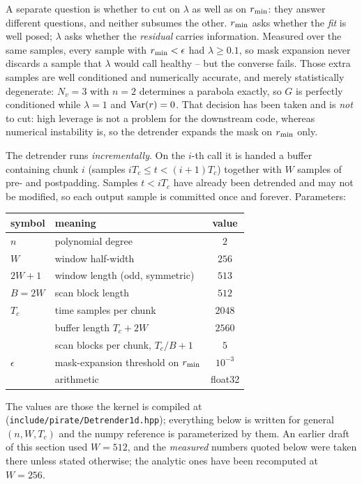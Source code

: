 \documentclass{article}
\numberwithin{equation}{section}   %
\begin{document}
A separate question is whether to cut on $\lambda$ as well as on $r_{\rm min}$: they answer different
questions, and neither subsumes the other.  $r_{\rm min}$ asks whether the {\em fit} is well posed; $\lambda$
asks whether the {\em residual} carries information.  Measured over the same samples, every sample with
$r_{\rm min} < \epsilon$ had $\lambda \ge 0.1$, so mask expansion never discards a sample that $\lambda$ would
call healthy -- but the converse fails.  Those extra samples are well conditioned and numerically accurate, and
merely statistically degenerate: $N_v = 3$ with $n = 2$ determines a parabola exactly, so $G$ is perfectly
conditioned while $\lambda = 1$ and ${\rm Var}(r) = 0$.  That decision has been taken and is {\em not} to cut:
high leverage is not a problem for the downstream code, whereas numerical instability is, so the detrender
expands the mask on $r_{\rm min}$ only.

The detrender runs {\em incrementally}.  On the $i$-th call it is handed a buffer containing chunk $i$
(samples $iT_c \le t < (i+1)T_c$) together with $W$ samples of pre- and postpadding.  Samples $t < iT_c$ have
already been detrended and may not be modified, so each output sample is committed once and forever.
Parameters:
\begin{center}
\small
\begin{tabular}{llc}
\toprule
symbol & meaning & value \\
\midrule
$n$      & polynomial degree                       & $2$ \\
$W$      & window half-width                       & $256$ \\
$2W{+}1$ & window length (odd, symmetric)          & $513$ \\
$B = 2W$ & scan block length                       & $512$ \\
$T_c$    & time samples per chunk                  & $2048$ \\
         & buffer length $T_c + 2W$                & $2560$ \\
         & scan blocks per chunk, $T_c/B + 1$      & $5$ \\
$\epsilon$ & mask-expansion threshold on $r_{\rm min}$ & $10^{-3}$ \\
         & arithmetic                              & float32 \\
\bottomrule
\end{tabular}
\end{center}
The values are those the kernel is compiled at ({\tt include/pirate/Detrender1d.hpp}); everything below is
written for general $(n, W, T_c)$ and the numpy reference is parameterized by them.  An earlier draft of this
section used $W = 512$, and the {\em measured} numbers quoted below were taken there unless stated otherwise;
the analytic ones have been recomputed at $W = 256$.
\end{document}
